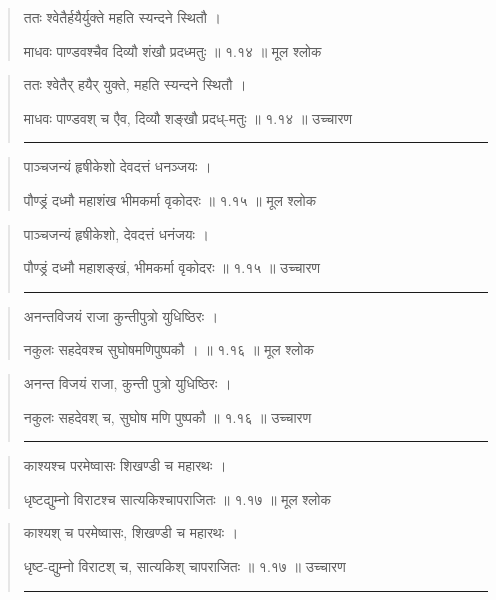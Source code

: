 \begin{quotation} 

ततः श्वेतैर्हयैर्युक्ते महति स्यन्दने स्थितौ  ।  

माधवः पाण्डवश्चैव दिव्यौ शंखौ प्रदध्मतुः   ॥ १.१४ ॥  मूल श्लोक
\end{quotation}

\begin{quotation}

ततः श्वेतैर् हयैर् युक्ते, महति स्यन्दने स्थितौ  ।  

माधवः पाण्डवश् च एैव, दिव्यौ शङ्खौ प्रदध्-मतुः  ॥ १.१४ ॥  उच्चारण

\noindent\rule{16cm}{0.4pt} 
\end{quotation}


\begin{quotation} 

पाञ्चजन्यं हृषीकेशो देवदत्तं धनञ्जयः  ।  

पौण्ड्रं दध्मौ महाशंख भीमकर्मा वृकोदरः  ॥ १.१५ ॥  मूल श्लोक
\end{quotation}

\begin{quotation}

पाञ्चजन्यं हृषीकेशो, देवदत्तं धनंजयः  ।  

पौण्ड्रं दध्मौ महाशङ्खं, भीमकर्मा वृकोदरः  ॥ १.१५ ॥  उच्चारण

\noindent\rule{16cm}{0.4pt} 
\end{quotation}


\begin{quotation} 

अनन्तविजयं राजा कुन्तीपुत्रो युधिष्ठिरः  ।  

नकुलः सहदेवश्च सुघोषमणिपुष्पकौ ।  
  ॥ १.१६ ॥  मूल श्लोक
\end{quotation}

\begin{quotation}

अनन्त विजयं राजा, कुन्ती पुत्रो युधिष्ठिरः  ।  

नकुलः सहदेवश् च, सुघोष मणि पुष्पकौ  ॥ १.१६ ॥  उच्चारण

\noindent\rule{16cm}{0.4pt} 
\end{quotation}


\begin{quotation} 
काश्यश्च परमेष्वासः शिखण्डी च महारथः  ।  

धृष्टद्युम्नो विराटश्च सात्यकिश्चापराजितः  ॥ १.१७ ॥  मूल श्लोक
\end{quotation}

\begin{quotation}

काश्यश् च परमेष्वासः, शिखण्डी च महारथः  ।  

धृष्ट-द्युम्नो विराटश् च, सात्यकिश् चापराजितः  ॥ १.१७ ॥  उच्चारण

\noindent\rule{16cm}{0.4pt} 
\end{quotation}


